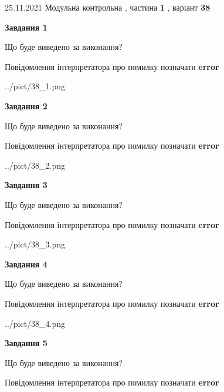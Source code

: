\documentclass[10pt, ukrainian]{article}
\begin{document}
{25.11.2021 Модульна контрольна , частина \textbf { 1 }, варіант  \No \textbf { 38 }\par}
{
\begin {large}

{\begin {center}\textbf{Завдання 1}\end {center}}\par
Що буде виведено за виконання? \par
Повідомлення інтерпретатора про помилку позначати \textbf{error}

\begin{center}
	{../pict/38_1.png}
\end{center}
\newpage

{\begin {center}\textbf{Завдання 2}\end {center}}\par
Що буде виведено за виконання? \par
Повідомлення інтерпретатора про помилку позначати \textbf{error}

\begin{center}
	{../pict/38_2.png}
\end{center}
\newpage

{\begin {center}\textbf{Завдання 3}\end {center}}\par
Що буде виведено за виконання? \par
Повідомлення інтерпретатора про помилку позначати \textbf{error}

\begin{center}
	{../pict/38_3.png}
\end{center}
\newpage

{\begin {center}\textbf{Завдання 4}\end {center}}\par
Що буде виведено за виконання? \par
Повідомлення інтерпретатора про помилку позначати \textbf{error}

\begin{center}
	{../pict/38_4.png}
\end{center}
\newpage

{\begin {center}\textbf{Завдання 5}\end {center}}\par
Що буде виведено за виконання? \par
Повідомлення інтерпретатора про помилку позначати \textbf{error}


\end{large}}
\end{document}
